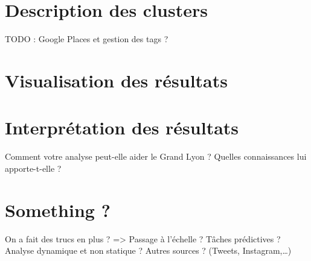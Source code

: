 \section{Description des clusters}
TODO : Google Places et gestion des tags ?
\pagebreak


\section{Visualisation des résultats}
\pagebreak


\section{Interprétation des résultats}
Comment votre analyse peut-elle aider le Grand Lyon ? Quelles connaissances lui apporte-t-elle ?
\pagebreak


\section{Something ?}
On a fait des trucs en plus ?
=> Passage à l’échelle ? Tâches prédictives ? Analyse dynamique et non statique ? Autres sources ? (Tweets, Instagram,…)
\pagebreak
